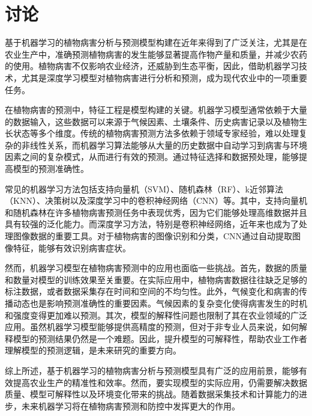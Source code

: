 \documentclass[AutoFakeBold]{LZUThesis-PgD&PhD}
\begin{document}
%		
%		
	
	
	
	
	
	
	\chapter{讨论}
	基于机器学习的植物病害分析与预测模型构建在近年来得到了广泛关注，尤其是在农业生产中，准确预测植物病害的发生能够显著提高作物产量和质量，并减少农药的使用。植物病害不仅影响农业经济，还威胁到生态平衡，因此，借助机器学习技术，尤其是深度学习模型对植物病害进行分析和预测，成为现代农业中的一项重要任务。
	
	在植物病害的预测中，特征工程是模型构建的关键。机器学习模型通常依赖于大量的数据输入，这些数据可以来源于气候因素、土壤条件、历史病害记录以及植物生长状态等多个维度。传统的植物病害预测方法多依赖于领域专家经验，难以处理复杂的非线性关系，而机器学习算法能够从大量的历史数据中自动学习到病害与环境因素之间的复杂模式，从而进行有效的预测。通过特征选择和数据预处理，能够提高模型的预测准确性。
	
	常见的机器学习方法包括支持向量机（SVM）、随机森林（RF）、k近邻算法（KNN）、决策树以及深度学习中的卷积神经网络（CNN）等。其中，支持向量机和随机森林在许多植物病害预测任务中表现优秀，因为它们能够处理高维数据并且具有较强的泛化能力。而深度学习方法，特别是卷积神经网络，近年来也成为了处理图像数据的重要工具。对于植物病害的图像识别和分类，CNN通过自动提取图像特征，能够有效识别病害症状。
	
	然而，机器学习模型在植物病害预测中的应用也面临一些挑战。首先，数据的质量和数量对模型的训练效果至关重要。在实际应用中，植物病害数据往往缺乏足够的标注数据，或者数据采集存在时间和空间的不均匀性。此外，气候变化和病害的传播动态也是影响预测准确性的重要因素。气候因素的复杂变化使得病害发生的时机和强度变得更加难以预测。其次，模型的解释性问题也限制了其在农业领域的广泛应用。虽然机器学习模型能够提供高精度的预测，但对于非专业人员来说，如何解释模型的预测结果仍然是一个难题。因此，提升模型的可解释性，帮助农业工作者理解模型的预测逻辑，是未来研究的重要方向。
	
	综上所述，基于机器学习的植物病害分析与预测模型具有广泛的应用前景，能够有效提高农业生产的精准性和效率。然而，要实现模型的实际应用，仍需要解决数据质量、模型可解释性以及环境变化带来的挑战。随着数据采集技术和计算能力的进步，未来机器学习将在植物病害预测和防控中发挥更大的作用。
\end{document}
